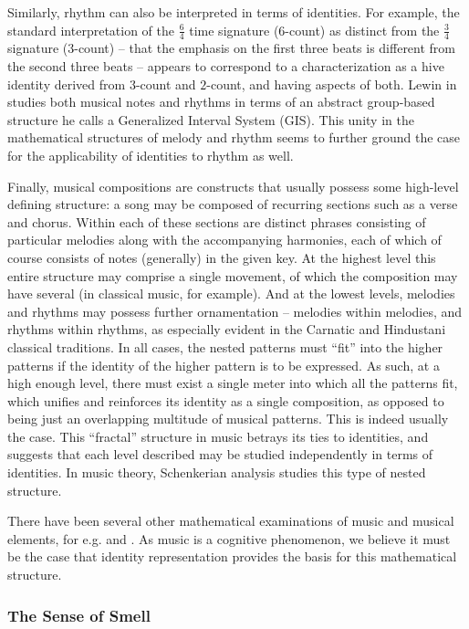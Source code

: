 \documentclass[pra,twocolumn,groupedaddress,10pt]{revtex4}
\theoremstyle{definition}
\begin{document}
Similarly, rhythm can also be interpreted in terms of identities. For example, the standard interpretation of the $\frac{6}{4}$ time signature ($6$-count) as distinct from the $\frac{3}{4}$ signature ($3$-count) -- that the emphasis on the first three beats is different from the second three beats -- appears to correspond to a characterization as a hive identity derived from $3$-count and $2$-count, and having aspects of both. Lewin in \cite{gmit} studies both musical notes and rhythms in terms of an abstract group-based structure he calls a Generalized Interval System (GIS). This unity in the mathematical structures of melody and rhythm seems to further ground the case for the applicability of identities to rhythm as well.

Finally, musical compositions are constructs that usually possess some high-level defining structure: a song may be composed of recurring sections such as a verse and chorus. Within each of these sections are distinct phrases consisting of particular melodies along with the accompanying harmonies, each of which of course consists of notes (generally) in the given key. At the highest level this entire structure may comprise a single movement, of which the composition may have several (in classical music, for example). And at the lowest levels, melodies and rhythms may possess further ornamentation -- melodies within melodies, and rhythms within rhythms, as especially evident in the Carnatic and Hindustani classical traditions. In all cases, the nested patterns must ``fit'' into the higher patterns if the identity of the higher pattern is to be expressed. As such, at a high enough level, there must exist a single meter into which all the patterns fit, which unifies and reinforces its identity as a single composition, as opposed to being just an overlapping multitude of musical patterns. This is indeed usually the case. This ``fractal'' structure in music betrays its ties to identities, and suggests that each level described may be studied independently in terms of identities. In music theory, Schenkerian analysis\cite{schenker} studies this type of nested structure.

There have been several other mathematical examinations of music and musical elements, for e.g. \cite{musicmath} and \cite{musselfsim}. As music is a cognitive phenomenon, we believe it must be the case that identity representation provides the basis for this mathematical structure.

\subsubsection{The Sense of Smell} \label{sec:sensme}
\end{document}
